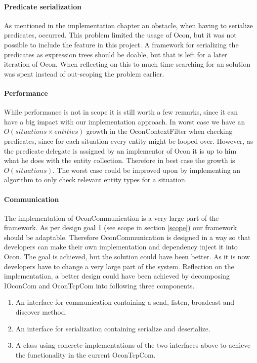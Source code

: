 \documentclass[../report.tex]{subfiles}
\begin{document}
\graphicspath{{img/}{../img/}}

\paragraph{Predicate serialization}
As mentioned in the implementation chapter an obstacle, when having to serialize predicates, occurred. This problem limited the usage of Ocon, but it was not possible to include the feature in this project. A framework for serializing the predicates as expression trees should be doable, but that is left for a later iteration of Ocon. When reflecting on this to much time searching for an solution was spent instead of out-scoping the problem earlier. 


\paragraph{Performance}
While performance is not in scope it is still worth a few remarks, since it can have a big impact with our implementation approach. In worst case we have an $ O(situations\times entities) $ growth in the OconContextFilter when checking predicates, since for each situation every entity might be looped over. However, as the predicate delegate is assigned by an implementor of Ocon it is up to him what he does with the entity collection. Therefore in best case the growth is $ O(situations) $. The worst case could be improved upon by implementing an algorithm to only check relevant entity types for a situation.

\paragraph{Communication}
The implementation of OconCommunication is a very large part of the framework. As per design goal 1 (see scope in section \ref{scope}) our framework should be adaptable. Therefore OconCommunication is designed in a way so that developers can make their own implementation and dependency inject it into Ocon. The goal is achieved, but the solution could have been better. As it is now developers have to change a very large part of the system. Reflection on the implementation, a better design could have been achieved by decomposing IOconCom and OconTcpCom into following three components.



\begin{enumerate}
\item An interface for communication containing a send, listen, broadcast and discover method.
\item An interface for serialization containing serialize and deserialize.
\item A class using concrete implementations of the two interfaces above to achieve the functionality in the current OconTcpCom.
\end{enumerate}
\end{document}
